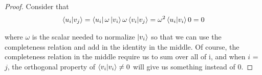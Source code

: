 \documentclass{article}
\begin{document}
\begin{proof}
    Consider that
    \begin{align}
        \bra{u_i} \ket{v_j} = \bra{u_i} \omega \ket{v_i} \omega \bra{v_i} \ket{v_j} = \omega^2 \bra{u_i} \ket{v_i} 0 = 0
    \end{align}

    where $\omega$ is the scalar needed to normalize $\ket{v_i}$ so that we can use the completeness relation and add in the identity in the middle. Of course, the completeness relation in the middle require us to sum over all of i, and when $i$ = $j$, the orthogonal property of $\bra{v_i}\ket{v_i} \neq 0$ will give us something instead of $0$.
    
\end{proof}
\end{document}
